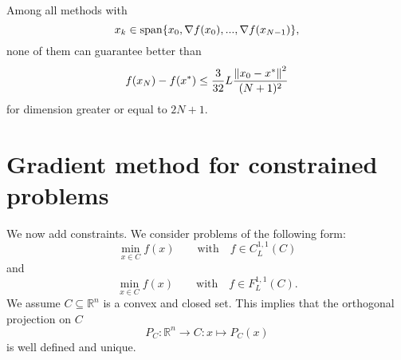 Among all methods with
\begin{equation*}
x_k \in \mathrm{span}\{x_0, \nabla f(x_0), ..., \nabla f(x_{N-1})\},
\end{equation*}
none of them can guarantee better than
\begin{equation*}
f(x_N) - f(x^*) \le \frac{3}{32}L \frac{{\left\Vert x_0-x^* \right\Vert}^2}{(N+1)^2}
\end{equation*}
for dimension greater or equal to $2N+1$.

\section{Gradient method for constrained problems}

We now add constraints. We consider problems of the following form:
\begin{equation*}
\min_{x \in C} f(x) \qquad \text{with} \quad f \in C_L^{1,1}(C)
\end{equation*}
and
\begin{equation*}
\min_{x \in C} f(x) \qquad \text{with} \quad f \in F_L^{1,1}(C) .
\end{equation*}
We assume $C \subseteq \mathbb{R}^n$ is a convex and closed set. This implies that the orthogonal projection on $C$
\begin{equation*}
P_C : \mathbb{R}^n \to C : x \mapsto P_C(x)
\end{equation*}
is well defined and unique.\\


